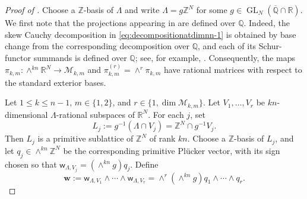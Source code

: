 \documentclass[reqno,11pt]{amsart}
\numberwithin{equation}{section}
\theoremstyle{definition}
\theoremstyle{remark}
\newcommand{\op}{\operatorname}
\newcommand{\br}{\mathbb R}
\newcommand{\GL}{\op{GL}}
\begin{document}
\begin{proof}[Proof of ]
Choose a $\mathbb Z$-basis of $\Lambda$ and
write
$
\Lambda=g\mathbb Z^N$ for some
$g\in\GL_N(\overline{\mathbb Q}\cap\mathbb R).
$ We first note that the projections appearing in
 are defined over $\mathbb Q$. Indeed, the
skew Cauchy decomposition in \eqref{eq:decompositionatdimnn-1} is obtained
by base change from the corresponding decomposition over $\mathbb Q$,
and each of its Schur-functor summands is defined over $\mathbb Q$; see,
for example, \cite{ABW,FultonYT}. Consequently, the maps
$\pi_{k,m}:\wedge^{kn}\mathbb R^N\to\mathcal M_{k,m}$
and $\pi_{k,m}^{(r)}=\wedge^r\pi_{k,m} $
have rational matrices with respect to the standard exterior bases.

Let $1\le k\le n-1$, $m\in\{1,2\}$, and $r\in\{1,\dim {\mathcal M_{k, m}} \}$. Let $V_1,\ldots,V_r$ be $kn$-dimensional
$\Lambda$-rational subspaces of $\br^N$. For each $j$, set
$$
L_j:=g^{-1}(\Lambda\cap V_j)
      =\mathbb Z^N\cap g^{-1}V_j.
$$
Then $L_j$ is a primitive sublattice of $\mathbb Z^N$ of rank
$kn$. Choose a $\mathbb Z$-basis of $L_j$, and let $q_j\in\wedge^{kn}\mathbb Z^N$
be the corresponding primitive Pl\"ucker vector, with its sign chosen so
that
$\mathsf w_{\Lambda,V_j}=(\wedge^{kn}g)q_j. $
Define
\begin{equation}\label{eq:algebraic-plucker-transfer}
\mathbf w
:=
\mathsf w_{\Lambda,V_1}\wedge\cdots\wedge
\mathsf w_{\Lambda,V_r}=\wedge^r\!\left(\wedge^{kn}g\right) q_1\wedge\cdots\wedge q_r.
\end{equation}


\end{proof}
\end{document}
